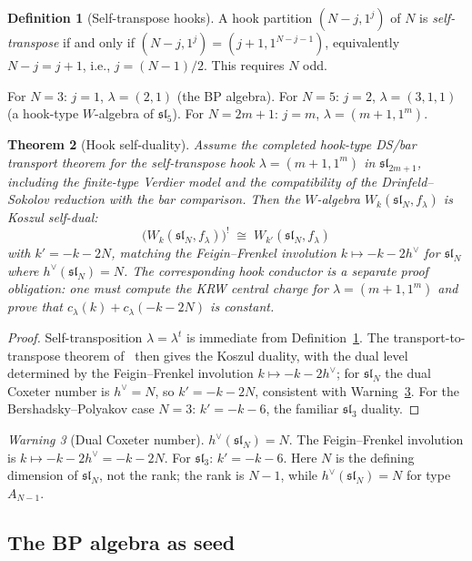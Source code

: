 \documentclass[11pt]{article}
\theoremstyle{plain}
\newtheorem{theorem}{Theorem}[section]
\theoremstyle{definition}
\newtheorem{definition}[theorem]{Definition}
\theoremstyle{remark}
\newtheorem{warning}[theorem]{Warning}
\newcommand{\fsl}{\mathfrak{sl}}
\numberwithin{equation}{section}
\begin{document}
\begin{definition}[Self-transpose hooks]\label{def:self-transpose}
A hook partition $(N-j, 1^j)$ of $N$ is \emph{self-transpose} if and
only if $(N-j, 1^j) = (j+1, 1^{N-j-1})$, equivalently
$N-j = j+1$, i.e., $j = (N-1)/2$. This requires $N$ odd.
\end{definition}

For $N=3$: $j = 1$, $\lambda = (2,1)$ (the BP algebra).
For $N=5$: $j = 2$, $\lambda = (3,1,1)$ (a hook-type $W$-algebra of
$\fsl_5$). For $N = 2m+1$: $j = m$, $\lambda = (m+1, 1^m)$.

\begin{theorem}[Hook self-duality]\label{thm:hook-self-duality}
Assume the completed hook-type DS/bar transport theorem for the
self-transpose hook $\lambda=(m+1,1^m)$ in $\fsl_{2m+1}$, including
the finite-type Verdier model and the compatibility of the
Drinfeld--Sokolov reduction with the bar comparison. Then the
$W$-algebra
$W_k(\fsl_N, f_\lambda)$ is Koszul self-dual:
\[
 \bigl(W_k(\fsl_N, f_\lambda)\bigr)^!
 \;\cong\;
 W_{k'}(\fsl_N, f_\lambda)
\]
with $k' = -k - 2N$, matching the Feigin--Frenkel involution
$k \mapsto -k - 2h^\vee$ for $\fsl_N$ where $h^\vee(\fsl_N) = N$.
The corresponding hook conductor is a separate proof obligation:
one must compute the KRW central charge for $\lambda=(m+1,1^m)$ and
prove that $c_\lambda(k)+c_\lambda(-k-2N)$ is constant.
\end{theorem}

\begin{proof}
Self-transposition $\lambda = \lambda^t$ is immediate from
Definition~\ref{def:self-transpose}. The transport-to-transpose
theorem of~\cite{CLNS24} then gives the Koszul duality, with the
dual level determined by the Feigin--Frenkel involution
$k \mapsto -k - 2h^\vee$; for $\fsl_N$ the dual Coxeter number
is $h^\vee = N$, so $k' = -k - 2N$, consistent with
Warning~\textup{\ref{warn:dual-coxeter}}. For the Bershadsky--Polyakov
case $N=3$: $k' = -k - 6$, the familiar $\fsl_3$ duality.
\end{proof}

\begin{warning}[Dual Coxeter number]\label{warn:dual-coxeter}
$h^\vee(\fsl_N) = N$. The Feigin--Frenkel involution is
$k \mapsto -k - 2h^\vee = -k - 2N$. For $\fsl_3$: $k' = -k-6$.
Here $N$ is the defining dimension of $\fsl_N$, not the rank; the
rank is $N-1$, while $h^\vee(\fsl_N)=N$ for type $A_{N-1}$.
\end{warning}

\subsection{The BP algebra as seed}
\end{document}
